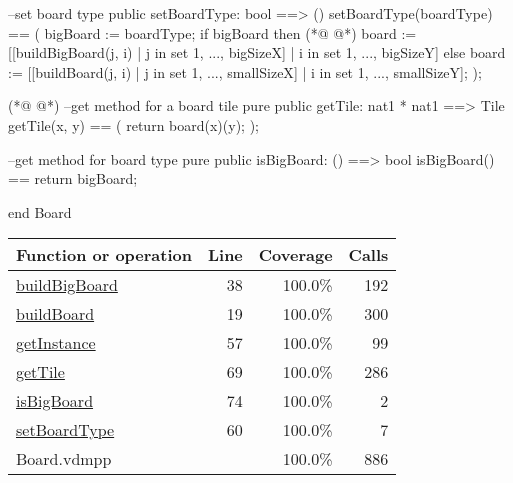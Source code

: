 \begin{vdmpp}[breaklines=true]
  --set board type
  public setBoardType: bool ==> () 
  setBoardType(boardType) == (
   bigBoard := boardType;
   if bigBoard then
(*@
\label{getTile:69}
@*)
     board := [[buildBigBoard(j, i) | j in set {1, ..., bigSizeX}] |  i in set {1, ..., bigSizeY}]
    else
     board := [[buildBoard(j, i) | j in set {1, ..., smallSizeX}] |  i in set {1, ..., smallSizeY}];
  );
  
(*@
\label{isBigBoard:74}
@*)
  --get method for a board tile
  pure public getTile: nat1 * nat1 ==> Tile
  getTile(x, y) == (
    return board(x)(y);
  );
  
  --get method for board type
  pure public isBigBoard: () ==> bool
  isBigBoard() == return bigBoard;
        
end Board
\end{vdmpp}
\bigskip
\begin{longtable}{|l|r|r|r|}
\hline
Function or operation & Line & Coverage & Calls \\
\hline
\hline
\hyperref[buildBigBoard:38]{buildBigBoard} & 38&100.0\% & 192 \\
\hline
\hyperref[buildBoard:19]{buildBoard} & 19&100.0\% & 300 \\
\hline
\hyperref[getInstance:57]{getInstance} & 57&100.0\% & 99 \\
\hline
\hyperref[getTile:69]{getTile} & 69&100.0\% & 286 \\
\hline
\hyperref[isBigBoard:74]{isBigBoard} & 74&100.0\% & 2 \\
\hline
\hyperref[setBoardType:60]{setBoardType} & 60&100.0\% & 7 \\
\hline
\hline
Board.vdmpp & & 100.0\% & 886 \\
\hline
\end{longtable}

